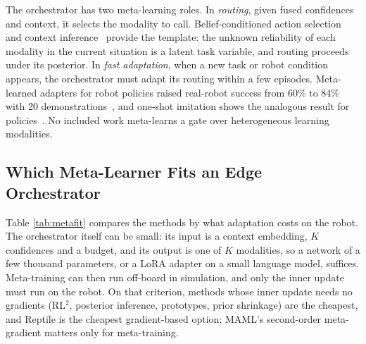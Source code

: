 \documentclass[journal]{IEEEtran}
\begin{document}
The orchestrator has two meta-learning roles. In \textit{routing}, given fused confidences and context, it selects the modality to call. Belief-conditioned action selection~\cite{Zintgraf2020} and context inference~\cite{Rakelly2019} provide the template: the unknown reliability of each modality in the current situation is a latent task variable, and routing proceeds under its posterior. In \textit{fast adaptation}, when a new task or robot condition appears, the orchestrator must adapt its routing within a few episodes. Meta-learned adapters for robot policies raised real-robot success from 60\% to 84\% with 20 demonstrations~\cite{Zhu2025}, and one-shot imitation shows the analogous result for policies~\cite{Duan2017}. No included work meta-learns a gate over heterogeneous learning modalities.


\subsection{Which Meta-Learner Fits an Edge Orchestrator}\label{sec:metafit}
Table \ref{tab:metafit} compares the methods by what adaptation costs on the robot. The orchestrator itself can be small: its input is a context embedding, $K$ confidences and a budget, and its output is one of $K$ modalities, so a network of a few thousand parameters, or a LoRA adapter on a small language model, suffices. Meta-training can then run off-board in simulation, and only the inner update must run on the robot. On that criterion, methods whose inner update needs no gradients (RL$^2$, posterior inference, prototypes, prior shrinkage) are the cheapest, and Reptile is the cheapest gradient-based option; MAML's second-order meta-gradient matters only for meta-training.
\end{document}
